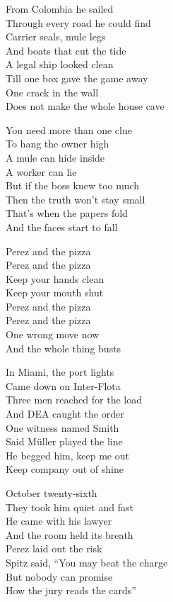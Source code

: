 \begin{lyrics}

From Colombia he sailed\\
Through every road he could find\\
Carrier seals, mule legs\\
And boats that cut the tide\\
A legal ship looked clean\\
Till one box gave the game away\\
One crack in the wall\\
Does not make the whole house cave

You need more than one clue\\
To hang the owner high\\
A mule can hide inside\\
A worker can lie\\
But if the boss knew too much\\
Then the truth won’t stay small\\
That’s when the papers fold\\
And the faces start to fall

Perez and the pizza\\
Perez and the pizza\\
Keep your hands clean\\
Keep your mouth shut\\
Perez and the pizza\\
Perez and the pizza\\
One wrong move now\\
And the whole thing busts

In Miami, the port lights\\
Came down on Inter-Flota\\
Three men reached for the load\\
And DEA caught the order\\
One witness named Smith\\
Said Müller played the line\\
He begged him, keep me out\\
Keep company out of shine

October twenty-sixth\\
They took him quiet and fast\\
He came with his lawyer\\
And the room held its breath\\
Perez laid out the risk\\
Spitz said, “You may beat the charge\\
But nobody can promise\\
How the jury reads the cards”


\end{lyrics}
